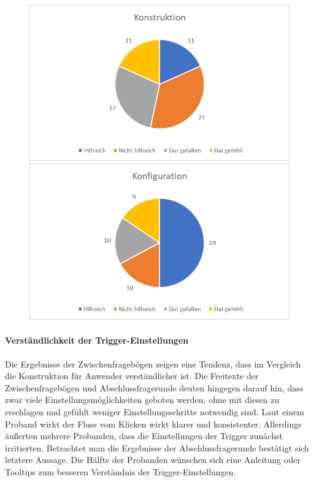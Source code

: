 \begin{figure}
   \begin{minipage}[b]{.49\linewidth} %
      \includegraphics[width=\linewidth]{pictures/diagramme/aussagenkonstr}
   \end{minipage}
   \hspace{.01\linewidth}%
   \begin{minipage}[b]{.49\linewidth} %
      \includegraphics[width=\linewidth]{pictures/diagramme/aussagenkonfig}
   \end{minipage}
   \caption{}
   \label{konfigabsch}
   \label{konstrabsch}
\end{figure}



\paragraph{Verständlichkeit der Trigger-Einstellungen}
Die Ergebnisse der Zwischenfragebögen zeigen eine Tendenz, dass im Vergleich die Konstruktion für Anwender verständlicher ist. Die Freitexte der Zwischenfragebögen und Abschlussfragerunde deuten hingegen darauf hin, dass zwar viele Einstellungsmöglichkeiten geboten werden, ohne mit diesen zu erschlagen und gefühlt weniger Einstellungsschritte notwendig sind. Laut einem Proband wirkt der Fluss vom Klicken wirkt klarer und konsistenter. Allerdings äußerten mehrere Probanden, dass die Einstellungen der Trigger zunächst irritierten. Betrachtet man die Ergebnisse der Abschlussfragerunde bestätigt sich letztere Aussage. Die Hälfte der Probanden wünschen sich eine Anleitung oder Tooltips zum besseren Verständnis der Trigger-Einstellungen.

